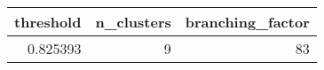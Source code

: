 \begin{tabular}{rrr}
\toprule
threshold & n_clusters & branching_factor \\
\midrule
0.825393 & 9 & 83 \\
\bottomrule
\end{tabular}
